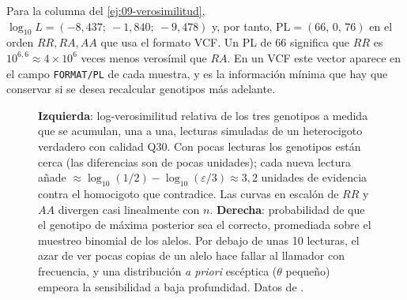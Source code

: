 \begin{simbolos}
\end{simbolos}

Para la columna del \cref{ej:09-verosimilitud}, $\log_{10}L = (-8{,}437;\ -1{,}840;\ -9{,}478)$ y, por tanto, $\mathrm{PL}=(66,\,0,\,76)$ en el orden $RR, RA, AA$ que usa el formato VCF. Un PL de 66 significa que $RR$ es $10^{6{,}6}\approx 4\times10^{6}$ veces menos verosímil que $RA$. En un VCF este vector aparece en el campo \texttt{FORMAT/PL} de cada muestra, y es la información mínima que hay que conservar si se desea recalcular genotipos más adelante.

\begin{figure}[t]
\centering
{}
\caption[Verosimilitud de genotipos y profundidad]{\textbf{Izquierda}: log-verosimilitud relativa de los tres genotipos a medida que se acumulan, una a una, lecturas simuladas de un heterocigoto verdadero con calidad Q30. Con pocas lecturas los genotipos están cerca (las diferencias son de pocas unidades); cada nueva lectura añade $\approx\log_{10}(1/2)-\log_{10}(\varepsilon/3)\approx 3{,}2$ unidades de evidencia contra el homocigoto que contradice. Las curvas en escalón de $RR$ y $AA$ divergen casi linealmente con $n$. \textbf{Derecha}: probabilidad de que el genotipo de máxima posterior sea el correcto, promediada sobre el muestreo binomial de los alelos. Por debajo de unas 10 lecturas, el azar de ver pocas copias de un alelo hace fallar al llamador con frecuencia, y una distribución \emph{a priori} escéptica ($\theta$ pequeño) empeora la sensibilidad a baja profundidad. Datos de .}
\label{fig:09-lik-prof}
\end{figure}

